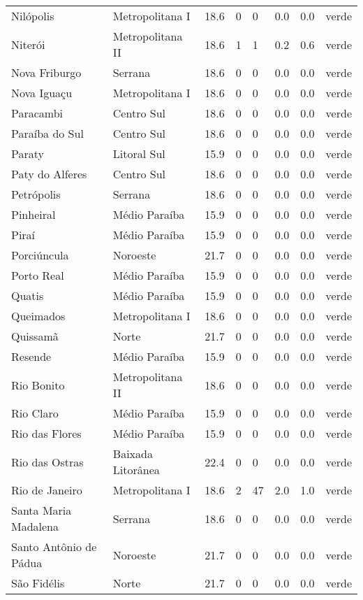 \begin{longtable}{l|lllllll}
  Nilópolis & Metropolitana I & 18.6 & 0 & 0 & 0.0 & 0.0 & verde \\ 
  Niterói & Metropolitana II & 18.6 & 1 & 1 & 0.2 & 0.6 & verde \\ 
  Nova Friburgo & Serrana & 18.6 & 0 & 0 & 0.0 & 0.0 & verde \\ 
  Nova Iguaçu & Metropolitana I & 18.6 & 0 & 0 & 0.0 & 0.0 & verde \\ 
  Paracambi & Centro Sul & 18.6 & 0 & 0 & 0.0 & 0.0 & verde \\ 
  Paraíba do Sul & Centro Sul & 18.6 & 0 & 0 & 0.0 & 0.0 & verde \\ 
  Paraty & Litoral Sul & 15.9 & 0 & 0 & 0.0 & 0.0 & verde \\ 
  Paty do Alferes & Centro Sul & 18.6 & 0 & 0 & 0.0 & 0.0 & verde \\ 
  Petrópolis & Serrana & 18.6 & 0 & 0 & 0.0 & 0.0 & verde \\ 
  Pinheiral & Médio Paraíba & 15.9 & 0 & 0 & 0.0 & 0.0 & verde \\ 
  Piraí & Médio Paraíba & 15.9 & 0 & 0 & 0.0 & 0.0 & verde \\ 
  Porciúncula & Noroeste & 21.7 & 0 & 0 & 0.0 & 0.0 & verde \\ 
  Porto Real & Médio Paraíba & 15.9 & 0 & 0 & 0.0 & 0.0 & verde \\ 
  Quatis & Médio Paraíba & 15.9 & 0 & 0 & 0.0 & 0.0 & verde \\ 
  Queimados & Metropolitana I & 18.6 & 0 & 0 & 0.0 & 0.0 & verde \\ 
  Quissamã & Norte & 21.7 & 0 & 0 & 0.0 & 0.0 & verde \\ 
  Resende & Médio Paraíba & 15.9 & 0 & 0 & 0.0 & 0.0 & verde \\ 
  Rio Bonito & Metropolitana II & 18.6 & 0 & 0 & 0.0 & 0.0 & verde \\ 
  Rio Claro & Médio Paraíba & 15.9 & 0 & 0 & 0.0 & 0.0 & verde \\ 
  Rio das Flores & Médio Paraíba & 15.9 & 0 & 0 & 0.0 & 0.0 & verde \\ 
  Rio das Ostras & Baixada Litorânea & 22.4 & 0 & 0 & 0.0 & 0.0 & verde \\ 
  Rio de Janeiro & Metropolitana I & 18.6 & 2 & 47 & 2.0 & 1.0 & verde \\ 
  Santa Maria Madalena & Serrana & 18.6 & 0 & 0 & 0.0 & 0.0 & verde \\ 
  Santo Antônio de Pádua & Noroeste & 21.7 & 0 & 0 & 0.0 & 0.0 & verde \\ 
  São Fidélis & Norte & 21.7 & 0 & 0 & 0.0 & 0.0 & verde \\ 

\end{longtable}
